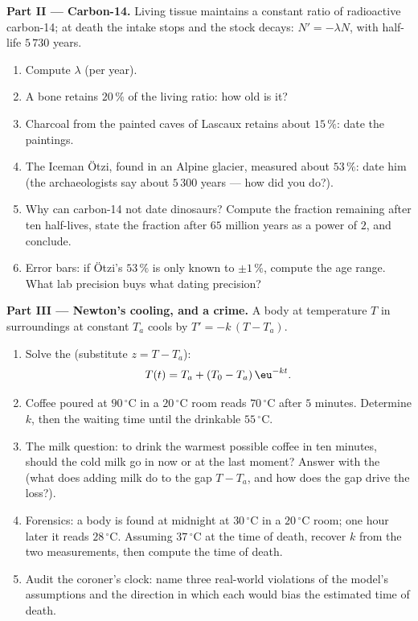 \begin{problem}
\medskip
\noindent\textbf{Part II --- Carbon-14.}
Living tissue maintains a constant ratio of radioactive
carbon-14; at death the intake stops and the stock decays:
$N' = -\lambda N$, with half-life $5\,730$ years.
\begin{enumerate}[resume]
  \item Compute $\lambda$ (per year).
  \item A bone retains $20\,\%$ of the living ratio: how old is
        it?
  \item Charcoal from the painted caves of Lascaux retains
        about $15\,\%$: date the paintings.
  \item The Iceman \"Otzi, found in an Alpine glacier, measured
        about $53\,\%$: date him (the archaeologists say about
        $5\,300$ years --- how did you do?).
  \item Why can carbon-14 not date dinosaurs? Compute the
        fraction remaining after ten half-lives, state the
        fraction after $65$ million years as a power of $2$,
        and conclude.
  \item Error bars: if \"Otzi's $53\,\%$ is only known to
        $\pm 1\,\%$, compute the age range. What lab precision
        buys what dating precision?
\end{enumerate}

\medskip
\noindent\textbf{Part III --- Newton's cooling, and a crime.}
A body at temperature $T$ in surroundings at constant $T_a$
cools by $T' = -k\,(T - T_a)$.
\begin{enumerate}[resume]
  \item Solve the  (substitute $z = T - T_a$):
        \[
        T(t) = T_a + (T_0 - T_a)\,\eu^{-kt} .
        \]
  \item Coffee poured at $90\,^\circ$C in a $20\,^\circ$C room
        reads $70\,^\circ$C after $5$ minutes. Determine $k$,
        then the waiting time until the drinkable
        $55\,^\circ$C.
  \item The milk question: to drink the warmest possible coffee
        in ten minutes, should the cold milk go in now or at
        the last moment? Answer with the  (what does
        adding milk do to the gap $T - T_a$, and how does the
        gap drive the loss?).
  \item Forensics: a body is found at midnight at
        $30\,^\circ$C in a $20\,^\circ$C room; one hour later
        it reads $28\,^\circ$C. Assuming $37\,^\circ$C at the
        time of death, recover $k$ from the two measurements,
        then compute the time of death.
  \item Audit the coroner's clock: name three real-world
        violations of the model's assumptions and the direction
        in which each would bias the estimated time of death.
\end{enumerate}


\end{problem}
